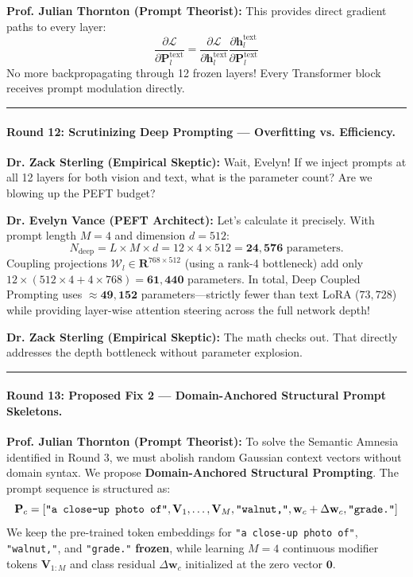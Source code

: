 \documentclass[letterpaper,11pt,leqno]{article}
\newcommand{\speakerVance}[1]{\noindent\textbf{\color{purple!80!black}Dr. Evelyn Vance (PEFT Architect):} #1\vspace{0.4em}}
\newcommand{\speakerThornton}[1]{\noindent\textbf{\color{blue!70!black}Prof. Julian Thornton (Prompt Theorist):} #1\vspace{0.4em}}
\newcommand{\speakerSterling}[1]{\noindent\textbf{\color{red!75!black}Dr. Zack Sterling (Empirical Skeptic):} #1\vspace{0.4em}}
\begin{document}
\speakerThornton{This provides direct gradient paths to every layer:
\begin{equation}
    \frac{\partial \mathcal{L}}{\partial \mathbf{P}_l^\mathrm{text}} = \frac{\partial \mathcal{L}}{\partial \mathbf{h}_l^\mathrm{text}} \frac{\partial \mathbf{h}_l^\mathrm{text}}{\partial \mathbf{P}_l^\mathrm{text}}
\end{equation}
No more backpropagating through 12 frozen layers! Every Transformer block receives prompt modulation directly.}

\vspace{0.8em}\hrule\vspace{0.8em}

\paragraph{Round 12: Scrutinizing Deep Prompting — Overfitting vs. Efficiency.}
\speakerSterling{Wait, Evelyn! If we inject prompts at all 12 layers for both vision and text, what is the parameter count? Are we blowing up the PEFT budget?}

\speakerVance{Let's calculate it precisely. With prompt length $M=4$ and dimension $d=512$:
\begin{equation}
    N_\mathrm{deep} = L \times M \times d = 12 \times 4 \times 512 = \mathbf{24,576} \text{ parameters}.
\end{equation}
Coupling projections $\mathcal{W}_l \in \mathbf{R}^{768 \times 512}$ (using a rank-4 bottleneck) add only $12 \times (512 \times 4 + 4 \times 768) = \mathbf{61,440}$ parameters. In total, Deep Coupled Prompting uses $\approx \mathbf{49,152}$ parameters---strictly fewer than text LoRA ($73,728$) while providing layer-wise attention steering across the full network depth!}

\speakerSterling{The math checks out. That directly addresses the depth bottleneck without parameter explosion.}

\vspace{0.8em}\hrule\vspace{0.8em}

\paragraph{Round 13: Proposed Fix 2 — Domain-Anchored Structural Prompt Skeletons.}
\speakerThornton{To solve the Semantic Amnesia identified in Round 3, we must abolish random Gaussian context vectors without domain syntax. We propose \textbf{Domain-Anchored Structural Prompting}. The prompt sequence is structured as:
\begin{equation}
    \mathbf{P}_c = \left[ \text{\texttt{"a close-up photo of"}}, \mathbf{V}_1, \dots, \mathbf{V}_M, \text{\texttt{"walnut,"}}, \mathbf{w}_c + \Delta \mathbf{w}_c, \text{\texttt{"grade."}} \right]
\end{equation}
We keep the pre-trained token embeddings for \texttt{"a close-up photo of"}, \texttt{"walnut,"}, and \texttt{"grade."} \textbf{frozen}, while learning $M=4$ continuous modifier tokens $\mathbf{V}_{1:M}$ and class residual $\Delta \mathbf{w}_c$ initialized at the zero vector $\mathbf{0}$.}
\end{document}
